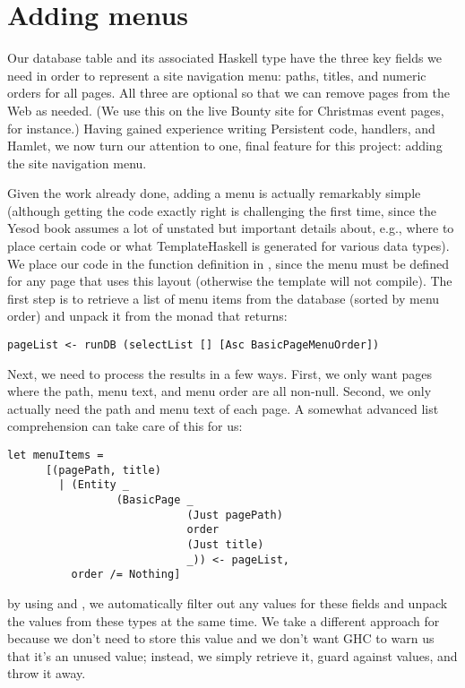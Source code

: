 \section{Adding menus}

Our  database table and its associated Haskell type have the three key fields we need in order to represent a site navigation menu: paths, titles, and numeric orders for all pages. All three are optional so that we can remove pages from the Web as needed. (We use this on the live Bounty site for Christmas event pages, for instance.) Having gained experience writing Persistent code, handlers, and Hamlet, we now turn our attention to one, final feature for this project: adding the site navigation menu.

Given the work already done, adding a menu is actually remarkably simple (although getting the code exactly right is challenging the first time, since the Yesod book assumes a lot of unstated but important details about, e.g., where to place certain code or what TemplateHaskell is generated for various data types). We place our code in the  function definition in , since the menu must be defined for any page that uses this layout (otherwise the template will not compile). The first step is to retrieve a list of menu items from the database (sorted by menu order) and unpack it from the monad that  returns:

\begin{Verbatim}
pageList <- runDB (selectList [] [Asc BasicPageMenuOrder])
\end{Verbatim}

Next, we need to process the results in a few ways. First, we only want pages where the path, menu text, and menu order are all non-null. Second, we only actually need the path and menu text of each page. A somewhat advanced list comprehension can take care of this for us:

\begin{Verbatim}
let menuItems = 
      [(pagePath, title) 
        | (Entity _ 
                 (BasicPage _ 
                            (Just pagePath) 
                            order
                            (Just title) 
                            _)) <- pageList,
          order /= Nothing]
\end{Verbatim}

by using  and , we automatically filter out any  values for these fields and unpack the values from these  types at the same time. We take a different approach for  because we don't need to store this value and we don't want GHC to warn us that it's an unused value; instead, we simply retrieve it, guard against  values, and throw it away.

